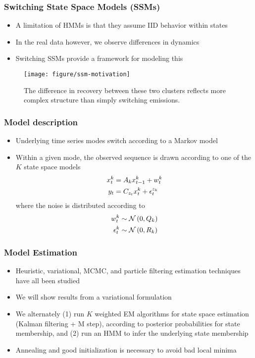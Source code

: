 \documentclass{beamer}
\begin{document}
\begin{frame}
  \frametitle{Switching State Space Models (SSMs)}
 \begin{itemize}
 \item A limitation of HMMs is that they assume IID behavior within states
 \item In the real data however, we observe differences in dynamics
 \item Switching SSMs provide a framework for modeling this \citep{ghahramani2000variational}
 \end{itemize} 

\begin{figure}[ht]
  \centering
  \texttt{[image: figure/ssm-motivation]}
  \caption{The difference in recovery between these two clusters reflects more
    complex structure than simply switching
    emissions. \label{fig:ssm-motivation}}
\end{figure}

\end{frame}

\begin{frame}
  \frametitle{Model description}
\begin{itemize}
\item Underlying time series modes switch according to a Markov model
\item Within a given mode, the observed sequence is drawn according to one of
  the $K$ state space models
  \begin{align*}
    x^{k}_{t} &= A_{k}x_{t - 1}^{k} + w^{k}_{t} \\
    y_{t} &= C_{z_{t}}x_{t}^{k} + \epsilon_{t}^{z_{k}}
    \end{align*}
  where the noise is distributed according to
  \begin{align*}
    w^{k}_{t} &\sim \mathcal{N}\left(0, Q_{k}\right) \\
    \epsilon^{k}_{t} &\sim \mathcal{N}\left(0, R_{k}\right)
  \end{align*}
\end{itemize}
\end{frame}

\begin{frame}
  \frametitle{Model Estimation}
  \begin{itemize}
  \item Heuristic, variational, MCMC, and particle filtering estimation
    techniques have all been studied \citep{harrison1976bayesian, ghahramani2000variational, fruhwirth2001markov, doucet2001particle}
  \item We will show results from a variational formulation
  \item We alternately (1) run $K$ weighted EM algorithms for state space
    estimation (Kalman filtering + M step), according to posterior probabilities
    for state membership, and (2) run an HMM to infer the underlying state
    membership
  \item Annealing and good initialization is necessary to avoid bad local minima
  \end{itemize}
\end{frame}
\end{document}
